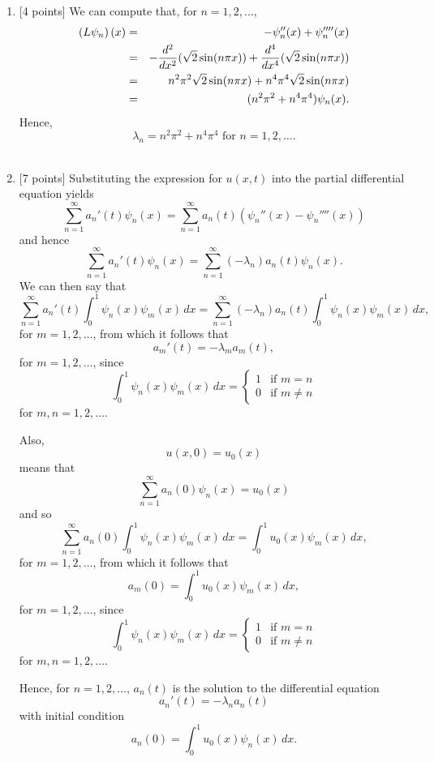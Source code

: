 \begin{solution}
\begin{enumerate}
\item {[4 points]} We can compute that, for $n=1,2,\ldots$,
\begin{eqnarray*}
\left(L \psi_n\right)(x) &=& -\psi_n''(x) + \psi_n''''(x)
\\
&=& -{d^2 \over dx^2} (\sqrt{2} \sin(n\pi x)) + {d^4\over dx^4}(\sqrt{2} \sin(n\pi x))
\\
&=& n^2\pi^2 \sqrt{2} \sin(n\pi x) + n^4\pi^4 \sqrt{2}\sin(n\pi x)
\\
&=& (n^2\pi^2 + n^4\pi^4) \psi_n(x).
\end{eqnarray*} 
Hence,
\[
\lambda_n = n^2\pi^2 + n^4\pi^4\mbox{ for }n=1,2,\ldots.
\]
\\
\item {[7 points]} Substituting the expression for $u(x,t)$ into the partial differential equation yields
\[
\sum_{n=1}^\infty a_n'(t) \psi_n(x) = \sum_{n=1}^\infty a_n(t) (\psi_n''(x) - \psi_n''''(x))
\]
and hence
\[
\sum_{n=1}^\infty a_n'(t) \psi_n(x) = \sum_{n=1}^\infty (-\lambda_n) a_n(t) \psi_n(x).
\]
We can then say that
\[
\sum_{n=1}^\infty a_n'(t) \int_0^1\psi_n(x)\psi_m(x)\,dx = \sum_{n=1}^\infty (-\lambda_n) a_n(t) \int_0^1\psi_n(x)\psi_m(x)\,dx,
\]
for $m=1,2,\ldots$, from which it follows that
\[
a_m'(t) = -\lambda_m a_m(t),
\]
for $m=1,2,\ldots$, since
\[
\int_0^1\psi_n(x)\psi_m(x)\,dx=\left\{\begin{array}{rl}1 & \mbox{if }m=n \\ 0 & \mbox{if }m\ne n\end{array}\right.
\]
for $m,n=1,2,\ldots$.

Also,
\[
u(x,0)=u_0(x)
\]
means that
\[
\sum_{n=1}^\infty a_n(0) \psi_n(x)=u_0(x)
\]
and so
\[
\sum_{n=1}^\infty a_n(0) \int_0^1\psi_n(x)\psi_m(x)\,dx=\int_0^1u_0(x)\psi_m(x)\,dx,
\]
for $m=1,2,\ldots$, from which it follows that
\[
a_m(0)=\int_0^1u_0(x)\psi_m(x)\,dx,
\]
for $m=1,2,\ldots$, since
\[
\int_0^1\psi_n(x)\psi_m(x)\,dx=\left\{\begin{array}{rl}1 & \mbox{if }m=n \\ 0 & \mbox{if }m\ne n\end{array}\right.
\]
for $m,n=1,2,\ldots$.

Hence, for $n=1,2,\ldots$, $a_n(t)$ is the solution to the differential equation
\[
a_n'(t) = -\lambda_n a_n(t)
\]
with initial condition
\[
a_n(0)=\int_0^1u_0(x)\psi_n(x)\,dx.
\]


\end{enumerate}
\end{solution}
